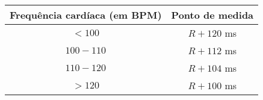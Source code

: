 \begin{tabular}{cc}
    \toprule
    Frequência cardíaca (em BPM) & Ponto de medida\\
    \midrule
    $<100$        & $R+120$ ms\\
    $100-110$  & $R+112$ ms\\
    $110-120$  & $R+104$ ms\\
    $>120$       & $R+100$ ms\\
    \bottomrule
\end{tabular}